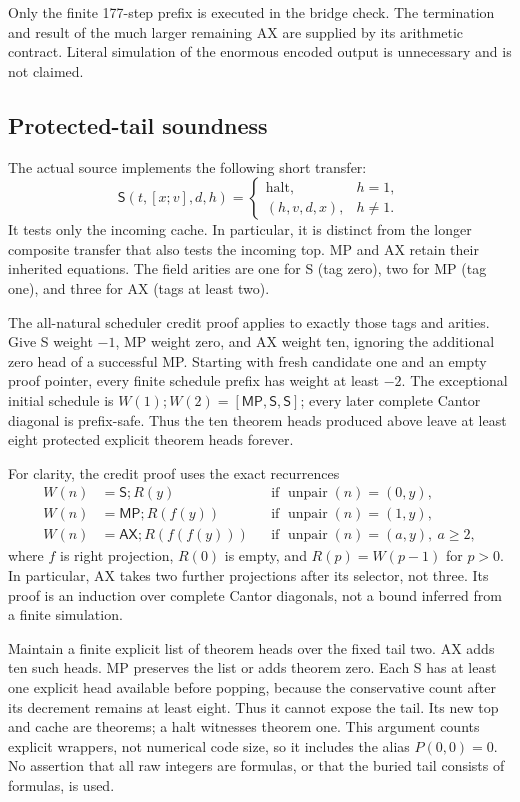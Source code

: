 Only the finite 177-step prefix is executed in the bridge check.  The
termination and result of the much larger remaining AX are supplied by
its arithmetic contract.  Literal simulation of the enormous encoded
output is unnecessary and is not claimed.

\subsection{Protected-tail soundness}

The actual source implements the following short transfer:
\[
 \mathsf S(t,[x;v],d,h)=
 \begin{cases}
    \text{halt},&h=1,\\
    (h,v,d,x),&h\ne1.
 \end{cases}
\]
It tests only the incoming cache.  In particular, it is distinct from
the longer composite transfer that also tests the incoming top.  MP and
AX retain their inherited equations.  The field arities are one for
S (tag zero), two for MP (tag one), and three for AX (tags at least two).

The all-natural scheduler credit proof applies to exactly those tags and
arities.  Give S weight $-1$, MP weight zero, and AX weight ten, ignoring
the additional zero head of a successful MP.  Starting with fresh
candidate one and an empty proof pointer, every finite schedule prefix
has weight at least $-2$.  The exceptional initial schedule is
$W(1);W(2)=[\mathsf{MP},\mathsf S,\mathsf S]$; every later complete
Cantor diagonal is prefix-safe.  Thus the ten theorem heads produced
above leave at least eight protected explicit theorem heads forever.

For clarity, the credit proof uses the exact recurrences
\[
\begin{aligned}
 W(n)&=\mathsf S;R(y) &&\text{if }\operatorname{unpair}(n)=(0,y),\\
 W(n)&=\mathsf{MP};R(f(y)) &&\text{if }\operatorname{unpair}(n)=(1,y),\\
 W(n)&=\mathsf{AX};R(f(f(y))) &&\text{if }\operatorname{unpair}(n)=(a,y),\ a\ge2,
\end{aligned}
\]
where $f$ is right projection, $R(0)$ is empty, and $R(p)=W(p-1)$
for $p>0$.  In particular, AX takes two further projections after its
selector, not three.  Its proof is an induction over complete Cantor
diagonals, not a bound inferred from a finite simulation.

Maintain a finite explicit list of theorem heads over the fixed tail
two.  AX adds ten such heads.  MP preserves the list or adds theorem
zero.  Each S has at least one explicit head available before popping,
because the conservative count after its decrement remains at least
eight.  Thus it cannot expose the tail.  Its new top and cache are
theorems; a halt witnesses theorem one.  This argument counts explicit
wrappers, not numerical code size, so it includes the alias $P(0,0)=0$.
No assertion that all raw integers are formulas, or that the buried
tail consists of formulas, is used.

